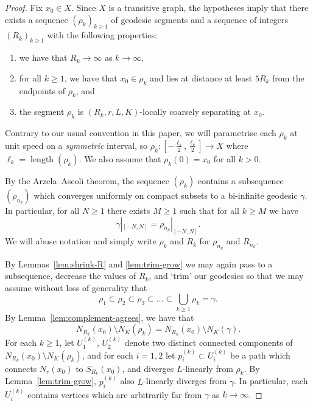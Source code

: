 \documentclass[10pt,a4paper]{amsart}
\DeclareMathOperator{\length}{length}
\theoremstyle{definition}
\begin{document}
\begin{proof}
    Fix $x_0 \in X$. Since $X$ is a transitive graph, the hypotheses imply that there exists a sequence $(\rho_k)_{k \geq 1}$ of geodesic segments and a sequence of integers $(R_k)_{k\geq 1}$ with the following properties:
    \begin{enumerate}
        \item we have that $R_k \to \infty$ as $k \to \infty$, 
    
        \item for all $k \geq 1$, we have that $x_0 \in \rho_k$ and lies at distance at least $5R_k$ from the endpoints of $\rho_k$, and  

        \item the segment $\rho_k$ is $(R_k,r, L, K)$-locally  coarsely separating at $x_0$. 
    \end{enumerate}
    Contrary to our usual convention in this paper, we will parametrise each $\rho_k$ at unit speed on a \emph{symmetric} interval, so $\rho_k : [-\tfrac {\ell_k} 2, \tfrac {\ell_k} 2] \to X$ where $\ell_k = \length (\rho_k)$. We also assume that  $\rho_k(0) = x_0$ for all $k > 0$. 
    
    By the Arzela--Ascoli theorem, the sequence $(\rho_k)$ contains a subsequence $(\rho_{n_k})$ which converges uniformly on compact subsets to a bi-infinite geodesic $\gamma$. 
    In particular, for all $N \geq 1$ there exists $M \geq 1$ such that for all $k \geq M$ we have 
    $$
    \gamma|_{[-N,N]} = \rho_{n_k}|_{[-N,N]}.
    $$ 
    We will abuse notation and simply write $\rho_k$ and $R_k$ for $\rho_{n_k}$ and $R_{n_k}$. 
    
    By Lemmas~\ref{lem:shrink-R} and \ref{lem:trim-grow} we may again pass to a subsequence, decrease the values of $R_k$, and `trim' our geodesics so that we may assume without loss of generality that 
    $$
    \rho_{1} \subset \rho_{2} \subset \rho_3 \subset \ldots \subset  \bigcup_{k \geq 1} \rho_k = \gamma. 
    $$
    By Lemma~\ref{lem:complement-agrees}, we have that 
    $$
    N_{R_k}(x_0) \setminus N_K(\rho_k) = N_{R_k}(x_0) \setminus N_K(\gamma). 
    $$
    For each $k \geq 1$, let $U_1^{(k)}$, $U_2^{(k)}$ denote two distinct connected components of $N_{R_k}(x_0) \setminus N_K(\rho_k)$, and for each $i =1,2$ let $p_i^{(k)} \subset U_i^{(k)}$ be a path which connects $N_r(x_0)$ to $S_{R_k}(x_0)$, and diverges $L$-linearly from $\rho_k$. By Lemma~\ref{lem:trim-grow}, $p_i^{(k)}$ also $L$-linearly diverges from $\gamma$. 
    In particular, each $U_i^{(k)}$ contains vertices which are arbitrarily far from $\gamma$ as $k \to \infty$. 




\end{proof}
\end{document}
